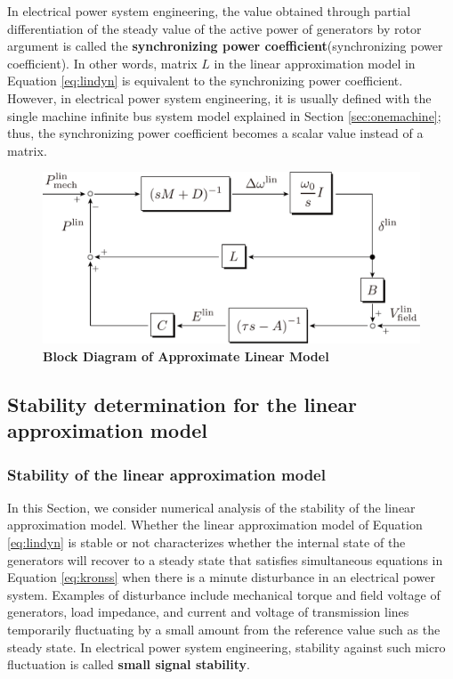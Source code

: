 \documentclass[tombow,dvipdfmx]{corona-a5-1.1}
\begin{document}
In electrical power system engineering, the value obtained through partial differentiation of the steady value of the active power of generators by rotor argument is called the \textbf{synchronizing power coefficient}(synchronizing power coefficient).
In other words, matrix $L$ in the linear approximation model in Equation \ref{eq:lindyn} is equivalent to the synchronizing power coefficient.
However, in electrical power system engineering, it is usually defined with the single machine infinite bus system model explained in Section \ref{sec:onemachine}; thus, the synchronizing power coefficient becomes a scalar value instead of a matrix.

\begin{figure}[t]
\centering
\includegraphics[width = .8\linewidth]{figs/blocklinsys3}
\medskip
\caption{\textbf{Block Diagram of Approximate Linear Model}}
\label{fig:blocklinsys}
\medskip
\end{figure}

\subsection{Stability determination for the linear approximation model}


\smallskip
\subsubsection{Stability of the linear approximation model}

In this Section, we consider numerical analysis of the stability of the linear approximation model.
Whether the linear approximation model of Equation \ref{eq:lindyn} is stable or not characterizes whether the internal state of the generators will recover to a steady state that satisfies simultaneous equations in Equation \ref{eq:kronss} when there is a minute disturbance in an electrical power system.
Examples of disturbance include mechanical torque and field voltage of generators, load impedance, and current and voltage of transmission lines temporarily fluctuating by a small amount from the reference value such as the steady state.
In electrical power system engineering, stability against such micro fluctuation is called \textbf{small signal stability}.
\end{document}
